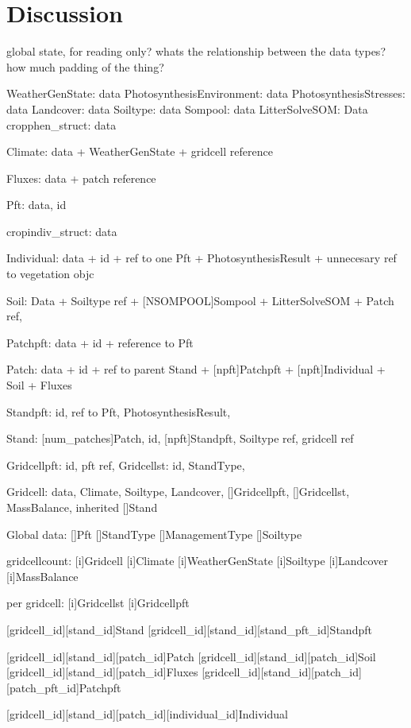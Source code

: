 \section{Discussion}
global state, for reading only?
whats the relationship between the data types?
how much padding of the thing?

WeatherGenState: data
PhotosynthesisEnvironment: data
PhotosynthesisStresses: data
Landcover: data
Soiltype: data
Sompool: data
LitterSolveSOM: Data
cropphen_struct: data

Climate: data + WeatherGenState + gridcell reference

Fluxes: data + patch reference

Pft: data, id

cropindiv_struct: data

Individual: data + id + ref to one Pft + PhotosynthesisResult + unnecesary ref to vegetation objc

Soil: Data + Soiltype ref + [NSOMPOOL]Sompool + LitterSolveSOM + Patch ref,

Patchpft: data + id + reference to Pft

Patch: data + id + ref to parent Stand + [npft]Patchpft + [npft]Individual + Soil + Fluxes

Standpft: id, ref to Pft, PhotosynthesisResult,

Stand: [num_patches]Patch, id, [npft]Standpft, Soiltype ref, gridcell ref

Gridcellpft: id, pft ref,
Gridcellst: id, StandType,

Gridcell: data, Climate, Soiltype, Landcover, []Gridcellpft, []Gridcellst, MassBalance, inherited []Stand



Global data:
  []Pft
  []StandType
  []ManagementType
  []Soiltype

gridcellcount:
  [i]Gridcell
  [i]Climate
  [i]WeatherGenState
  [i]Soiltype
  [i]Landcover
  [i]MassBalance

per gridcell:
  [i]Gridcellst
  [i]Gridcellpft

  [gridcell_id][stand_id]Stand
  [gridcell_id][stand_id][stand_pft_id]Standpft

  [gridcell_id][stand_id][patch_id]Patch
  [gridcell_id][stand_id][patch_id]Soil
  [gridcell_id][stand_id][patch_id]Fluxes
  [gridcell_id][stand_id][patch_id][patch_pft_id]Patchpft

  [gridcell_id][stand_id][patch_id][individual_id]Individual




